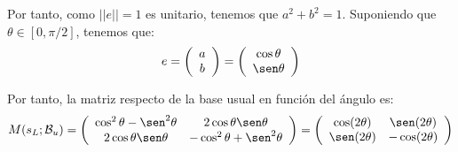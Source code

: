 \begin{ejercicio}
    Por tanto, como $||e||=1$ es unitario, tenemos que $a^2+b^2=1$. Suponiendo que $\theta \in [0,\pi/2]$, tenemos que:
    \begin{equation*}
        e=\left(\begin{array}{c}
            a \\ b
        \end{array}\right)
        = \left(\begin{array}{c}
            \cos \theta \\ \sen \theta
        \end{array}\right)
    \end{equation*}

    Por tanto, la matriz respecto de la base usual en función del ángulo es:
    \begin{equation*}
        M(s_L;\cc{B}_u) = \left(\begin{array}{cc}
            \cos^2 \theta - \sen^2\theta & 2\cos\theta\sen \theta \\
            2\cos\theta\sen \theta & -\cos^2 \theta+ \sen ^2 \theta
        \end{array}\right)
        = \left(\begin{array}{cc}
            \cos(2\theta) & \sen(2\theta) \\
            \sen(2\theta) & -\cos(2\theta)
        \end{array}\right)
    \end{equation*}

    
        
\end{ejercicio}




